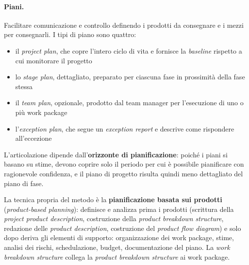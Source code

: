 \paragraph{Piani.} Facilitare comunicazione e controllo definendo i prodotti da
consegnare e i mezzi per consegnarli. I tipi di piano sono quattro:
\begin {itemize}
\item il \emph{project plan}, che copre l'intero ciclo di vita e fornisce la
\emph{baseline} rispetto a cui monitorare il progetto
\item lo \emph{stage plan}, dettagliato, preparato per ciascuna fase in
prossimit\`a della fase stessa
\item il \emph{team plan}, opzionale, prodotto dal team manager per l'esecuzione
di uno o pi\`u work package
\item l'\emph{exception plan}, che segue un \emph{exception report} e descrive
come rispondere all'eccezione
\end {itemize}
L'articolazione dipende dall'\textbf{orizzonte di pianificazione}: poich\'e i
piani si basano su stime, devono coprire solo il periodo per cui \`e possibile
pianificare con ragionevole confidenza, e il piano di progetto risulta quindi
meno dettagliato del piano di fase.

La tecnica propria del metodo \`e la \textbf{pianificazione basata sui prodotti}
(\emph{product-based planning}): definisce e analizza prima i prodotti (scrittura
della \emph{project product description}, costruzione della \emph{product
breakdown structure}, redazione delle \emph{product description}, costruzione
del \emph{product flow diagram}) e solo dopo deriva gli elementi di supporto:
organizzazione dei work package, stime, analisi dei rischi, schedulazione,
budget, documentazione del piano. La \emph{work breakdown structure} collega la
\emph{product breakdown structure} ai work package.

